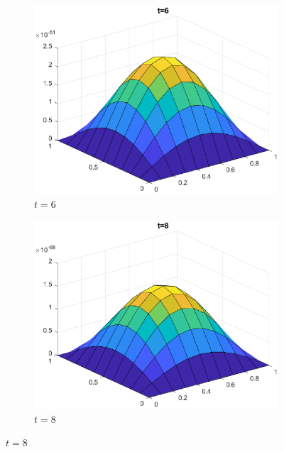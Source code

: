 \documentclass[]{article}
\begin{document}
	\begin{figure}[htbp]
		\centering	
		\vspace{1em}
		
		\begin{subfigure}[b]{0.45\textwidth}
			\includegraphics[width=\textwidth]{images/h2_t4.eps}
			\caption{$t = 6$}
			\label{fig:image7}
		\end{subfigure}
	\hfill
			\begin{subfigure}[b]{0.45\textwidth}
		\includegraphics[width=\textwidth]{images/h2_t5.eps}
		\caption{$t = 8$}
		\label{fig:image4}
	\end{subfigure}

		\label{fig:all_images}
	\end{figure}
\end{document}
